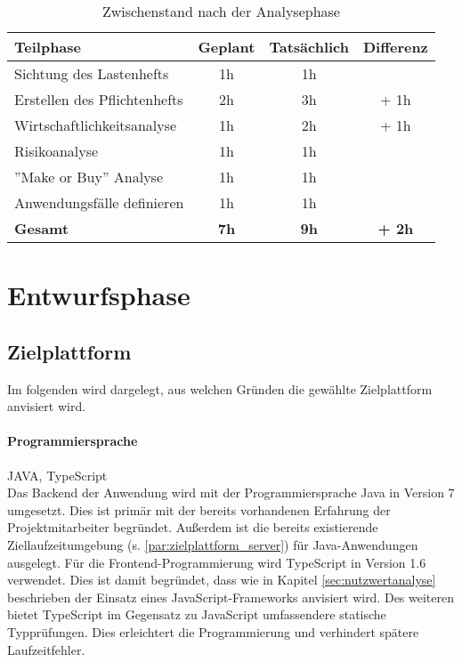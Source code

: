 \documentclass[12pt, xcolor=dvipsnames]{scrartcl}
\begin{document}
\begin{table}[H]
	\centering
	\begin{tabular}{lccc}

		\rowcolor{white!15}				
		\textbf{Teilphase} & \textbf{Geplant} & \textbf{Tatsächlich} & \textbf{Differenz} \\\hline		
		

		Sichtung des Lastenhefts & 1h & 1h & \\	    
	    Erstellen des Pflichtenhefts & 2h & 3h &  + 1h\\	    
	    Wirtschaftlichkeitsanalyse & 1h & 2h & + 1h\\	     
	    Risikoanalyse & 1h & 1h & \\	      
	    ''Make or Buy'' Analyse & 1h & 1h & \\	    
		Anwendungsfälle definieren & 1h & 1h & \\\hline

		\rowcolor{white!15}				
		\textbf{Gesamt} & \textbf{7h} & \textbf{9h} & \textbf{+ 2h} \\			

	    
	\end{tabular}
	\caption{Zwischenstand nach der Analysephase}
	\label{tab:zwischenstand_analysephase}
	\end{table}


\section{Entwurfsphase}

\subsection{Zielplattform}

Im folgenden wird dargelegt, aus welchen Gründen die gewählte Zielplattform anvisiert wird.

\paragraph{Programmiersprache} JAVA, TypeScript \\
Das Backend der Anwendung wird mit der Programmiersprache Java in Version 7 umgesetzt.
Dies ist primär mit der bereits vorhandenen Erfahrung der Projektmitarbeiter begründet. Außerdem ist die bereits existierende Ziellaufzeitumgebung (s. \ref{par:zielplattform_server}) für Java-Anwendungen ausgelegt.
Für die Frontend-Programmierung wird TypeScript in Version 1.6 verwendet. Dies ist damit begründet, dass wie in Kapitel \ref{sec:nutzwertanalyse} beschrieben der Einsatz eines JavaScript-Frameworks anvisiert wird. Des weiteren bietet TypeScript im Gegensatz zu JavaScript umfassendere statische Typprüfungen. Dies erleichtert die Programmierung und verhindert spätere Laufzeitfehler.
\end{document}
